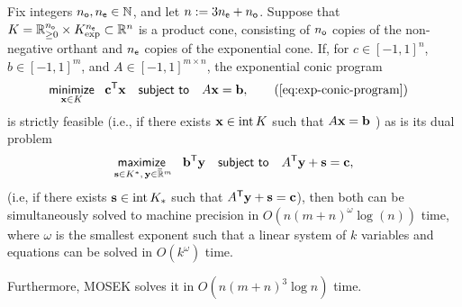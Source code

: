 \begin{lemma} \label{lem:mainlemma}
    Fix integers $n_{\sf o}, n_{\sf e} \in \mathbb N$, and let $n:= 3n_{\sf e} + n_{\sf o}$.
     Suppose that
     $K = \mathbb R_{\ge 0}^{n_{\sf o}} \times K^{n_{\sf e}}_{\exp} \subset \mathbb R^n$ is a product cone, consisting of $n_{\sf o}$ copies of the non-negative orthant and $n_{\sf e}$ copies of the exponential cone.
    If, for
    $c \in [-1,1]^{n}$, $ b \in [-1,1]^m$, and $A \in [-1,1]^{m \times n}$,
    the exponential conic program
    \begin{align*}
        &
        \minimize_{
            \mat x \in K}~~ \mat c^{\sf T} \mat x
        \quad\subjto\quad A \mat x = \mat b,
        \tag{\ref{eq:exp-conic-program}}
    \end{align*}
    is strictly feasible (i.e., if there exists $\mathbf{x} \in \mathrm{int}\, K$  such that $A \mathbf{x} = \mathbf{b}$ )
    as is its dual problem
    \[
        \maximize
            \limits_{
            \mat s \in K^*,\, \mat y \in \Rext^m} ~~ \mat b^{\sf T} \mat y
        \quad\subjto\quad  A^{\sf T} \mat y  +  \mat s = \mat c,
    \]
    (i.e, if there exists $\mathbf{s} \in \mathrm{int}\,K_*$ such that $A^{\sf T} \mathbf{y} + \mathbf{s} = \mathbf{c}$), 
    then both
    can be simultaneously
    solved to machine precision
    in $O(n (m+n)^{\omega} \log(n)
    )$ time,
    where $\omega$ is the smallest exponent such that a linear system of $k$ variables and equations can be solved in $O(k^\omega)$ time. 
    
    Furthermore, MOSEK solves it in $O(n (m+n)^3 \log n)$ time. 
\end{lemma}
